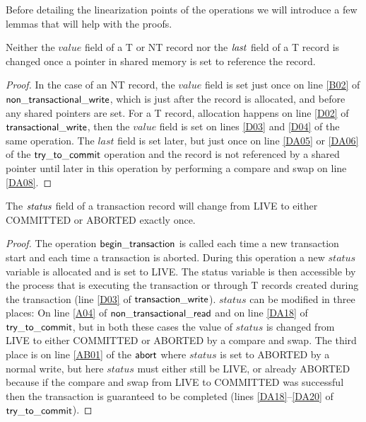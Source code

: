 Before detailing the linearization points of the operations we will introduce a few lemmas that will help
with the proofs.

\begin{lemma}
\label{lemma:si-nochange}
Neither the $\mathit{value}$ field of a T or NT record nor the $\ms{last}$ field of a T record is changed once a pointer in shared memory is set to 
reference the record.
\end{lemma}
\begin{proof}
In the case of an NT record, the $\mathit{value}$ field is set just once on line \ref{B02} of $\sf{non\_transactional\_write}$,
which is just after the record is allocated, and before any shared pointers are set.
For a T record, allocation happens on line \ref{D02} of $\sf{transactional\_write}$,
then the $\mathit{value}$ field is set on lines \ref{D03} and \ref{D04} of the same operation.
The $\mathit{last}$ field is set later, but just once on line \ref{DA05} or \ref{DA06} of the $\sf{try\_to\_commit}$ operation
and the record is not referenced by a shared pointer until later in this operation
by performing a compare and swap on line \ref{DA08}.
\end{proof}


\begin{lemma}
\label{lemma:si-statusonce}
The $\ms{status}$ field of a transaction record will change from LIVE to either COMMITTED or ABORTED
exactly once.
\end{lemma}
\begin{proof}
The operation $\sf{begin\_transaction}$ is called each time a new transaction start and each time a transaction is aborted.
During this operation a new $\mathit{status}$ variable is allocated and is set to LIVE.
The status variable is then accessible by the process that is executing the transaction or through T records created during the
transaction (line \ref{D03} of $\sf{transaction\_write}$).
$\mathit{status}$ can be modified in three places:
On line \ref{A04} of $\sf{non\_transactional\_read}$ and on line \ref{DA18} of $\sf{try\_to\_commit}$, but in both these cases
the value of $\mathit{status}$ is changed from LIVE to either COMMITTED or ABORTED by a compare and swap.
The third place is on line \ref{AB01} of the $\sf{abort}$ where $\mathit{status}$ is set to ABORTED by a normal write, but
here $\mathit{status}$ must either still be LIVE, or already ABORTED because if the compare and swap from LIVE to COMMITTED was
successful then the transaction is guaranteed to be completed (lines \ref{DA18}--\ref{DA20} of $\sf{try\_to\_commit}$).
\end{proof}


